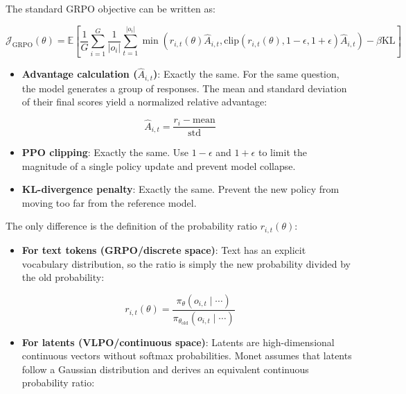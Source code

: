 The standard GRPO objective can be written as:

\[
\mathcal{J}_{\mathrm{GRPO}}(\theta)=
\mathbb{E}\left[
\frac{1}{G}\sum_{i=1}^{G}\frac{1}{|o_i|}
\sum_{t=1}^{|o_i|}
\min\left(
r_{i,t}(\theta)\hat A_{i,t},
\mathrm{clip}(r_{i,t}(\theta),1-\epsilon,1+\epsilon)\hat A_{i,t}
\right)
-\beta\mathrm{KL}
\right]
\]

\begin{itemize}
\tightlist
\item
{}
  \textbf{Advantage calculation (\(\hat A_{i,t}\))}: Exactly the same. For the same question, the model generates a group of responses. The mean and standard deviation of their final scores yield a normalized relative advantage:
\end{itemize}

\[
\hat A_{i,t}=\frac{r_i-\mathrm{mean}}{\mathrm{std}}
\]

\begin{itemize}
\tightlist
\item
  \textbf{PPO clipping}: Exactly the same. Use \(1-\epsilon\) and \(1+\epsilon\) to limit the magnitude of a single policy update and prevent model collapse.
\item
  \textbf{KL-divergence penalty}: Exactly the same. Prevent the new policy from moving too far from the reference model.
\end{itemize}

The only difference is the definition of the probability ratio \(r_{i,t}(\theta)\):

\begin{itemize}
\tightlist
\item
{}
  \textbf{For text tokens (GRPO/discrete space)}: Text has an explicit vocabulary distribution, so the ratio is simply the new probability divided by the old probability:
\end{itemize}

\[
r_{i,t}(\theta)=
\frac{\pi_{\theta}(o_{i,t}\mid\cdots)}
{\pi_{\theta_{\mathrm{old}}}(o_{i,t}\mid\cdots)}
\]

\begin{itemize}
\tightlist
\item
{}
  \textbf{For latents (VLPO/continuous space)}: Latents are high-dimensional continuous vectors without softmax probabilities. Monet assumes that latents follow a Gaussian distribution and derives an equivalent continuous probability ratio:
\end{itemize}

